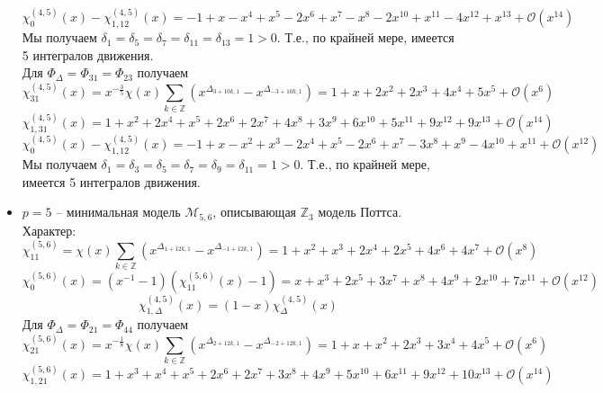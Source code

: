 \documentclass[12pt]{article}
\theoremstyle{definition}
\begin{document}
\begin{itemize}
\begin{equation}
        \chi^{(4,5)}_0(x)-\chi^{(4,5)}_{1,12}(x)=-1+x-x^4+x^5-2x^6+x^7-x^8-2x^{10}+x^{11}-4x^{12}+x^{13}+\mathcal{O}(x^{14})
    \end{equation}
    Мы получаем $\delta_1=\delta_5=\delta_7=\delta_{11}=\delta_{13}=1>0$. Т.е., по крайней мере, имеется 5 интегралов движения.\\
    Для $\Phi_\Delta=\Phi_{31}=\Phi_{23}$ получаем
    \begin{equation}
        \chi^{(4,5)}_{31}(x)=x^{-\frac{3}{5}}\chi(x)\sum\limits_{k\in\mathbb{Z}}(x^{\Delta_{3+10k,1}}-x^{\Delta_{-3+10k,1}})=1+x+2x^2+2x^3+4x^4+5x^5+\mathcal{O}(x^6)
    \end{equation}
    \begin{equation}
        \chi^{(4,5)}_{1,31}(x)=1+x^2+2x^4+x^5+2x^6+2x^7+4x^8+3x^9+6x^{10}+5x^{11}+9x^{12}+9x^{13}+\mathcal{O}(x^{14})
    \end{equation}
    \begin{equation}
        \chi^{(4,5)}_0(x)-\chi^{(4,5)}_{1,12}(x)=-1+x-x^2+x^3-2x^4+x^5-2x^6+x^7-3x^8+x^9-4x^{10}+x^{11}+\mathcal{O}(x^{12})
    \end{equation}
    Мы получаем $\delta_1=\delta_3=\delta_5=\delta_7=\delta_9=\delta_{11}=1>0$. Т.е., по крайней мере, имеется 5 интегралов движения.
    \item $p=5$ -- минимальная модель $\mathcal{M}_{5,6}$, описывающая $\mathbb{Z}_3$ модель Поттса. Характер:
    \begin{equation}
        \chi_{11}^{(5,6)}=\chi(x)\sum\limits_{k\in\mathbb{Z}}(x^{\Delta_{1+12k,1}}-x^{\Delta_{-1+12k,1}})=1+x^2+x^3+2x^4+2x^5+4x^6+4x^7+\mathcal{O}(x^8)
    \end{equation}
    \begin{equation}
        \chi^{(5,6)}_0(x)=(x^{-1}-1)(\chi^{(5,6)}_{11}(x)-1)=x+x^3+2x^5+3x^7+x^8+4x^9+2x^{10}+7x^{11}+\mathcal{O}(x^{12})
    \end{equation}
    \begin{equation}
        \chi^{(4,5)}_{1,\Delta}(x)=(1-x)\chi^{(4,5)}_\Delta(x)
    \end{equation}
    Для $\Phi_\Delta=\Phi_{21}=\Phi_{44}$ получаем
    \begin{equation}
        \chi^{(5,6)}_{21}(x)=x^{-\frac{1}{8}}\chi(x)\sum\limits_{k\in\mathbb{Z}}(x^{\Delta_{2+12k,1}}-x^{\Delta_{-2+12k,1}})=1+x+x^2+2x^3+3x^4+4x^5+\mathcal{O}(x^6)
    \end{equation}
    \begin{equation}
        \chi^{(5,6)}_{1,21}(x)=1+x^3+x^4+x^5+2x^6+2x^7+3x^8+4x^9+5x^{10}+6x^{11}+9x^{12}+10x^{13}+\mathcal{O}(x^{14})

\end{equation}
\end{itemize}
\end{document}
